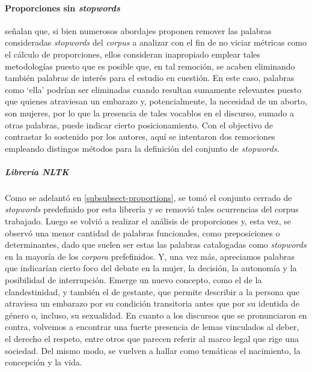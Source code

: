 \paragraph{Proporciones sin \textit{stopwords}}
\cite{monroe2008fightin} señalan que, si bien numerosos abordajes proponen remover
las palabras consideradas \textit{stopwords} del \textit{corpus} a analizar con el
fin de no viciar métricas como el cálculo de proporciones, ellos consideran inapropiado
emplear tales metodologías puesto que es posible que, en tal remoción, se acaben
eliminando también palabras de interés para el estudio en cuestión. En este caso,
palabras como `ella' podrían ser eliminadas cuando resultan sumamente relevantes
puesto que quienes atraviesan un embarazo y, potencialmente, la necesidad de un
aborto, son mujeres, por lo que la presencia de tales vocablos en el discurso, sumado
a otras palabras, puede indicar cierto posicionamiento. Con el objectivo de
contrastar lo sostenido por los autores, aquí se intentaron dos remociones empleando
distingos métodos para la definición del conjunto de \textit{stopwords}.

\subparagraph{Librería NLTK}
Como se adelantó en \ref{subsubsect-proportions}, se tomó el conjunto cerrado de
\textit{stopwords} predefinido por esta librería y se removió tales ocurrencias
del corpus trabajado.
Luego se volvió a realizar el análisis de proporciones y, esta
vez, se observó una menor cantidad de palabras funcionales,
como preposiciones o determinantes, dado que suelen ser estas
las palabras catalogadas como \textit{stopwords} en la mayoría de
los \textit{corpora} prefefinidos. Y, una vez más, apreciamos palabras que indicarían
cierto foco del debate en la mujer, la decisión, la autonomía y la posibilidad de
interrupción. Emerge un nuevo concepto, como el de la clandestinidad, y también
el de gestante, que permite describir a la persona que atraviesa un embarazo por
su condición transitoria antes que por su identida de género o, incluso, su
sexualidad.
En cuanto a los discursos que se pronunciaron en contra, volvemos a
encontrar una fuerte presencia de lemas vinculados al deber, el derecho
el respeto, entre otros que parecen referir al marco legal que rige una
sociedad. Del mismo modo, se vuelven a hallar como temáticas el nacimiento,
la concepción y la vida.

